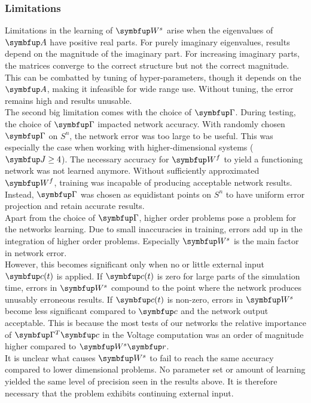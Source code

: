 \subsubsection{Limitations}
Limitations in the learning of $\bmu{W}^s$ arise when the eigenvalues of $\bmu{A}$ have positive real parts. For purely imaginary eigenvalues, results depend on the magnitude of the imaginary part. For increasing imaginary parts, the matrices converge to the correct structure but not the correct magnitude. This can be combatted by tuning of hyper-parameters, though it depends on the $\bmu{A}$, making it infeasible for wide range use. Without tuning, the error remains high and results unusable.\\
The second big limitation comes with the choice of $\bmu{\Gamma}$. During testing, the choice of $\bmu{\Gamma}$ impacted network accuracy. With randomly chosen $\bmu{\Gamma}$ on $\mathit{S}^n$, the network error was too large to be useful. This was especially the case when working with higher-dimensional systems ($\bmu{J}\geq4$). The necessary accuracy for $\bmu{W}^f$ to yield a functioning network was not learned anymore. Without sufficiently approximated $\bmu{W}^f$, training was incapable of producing acceptable network results.\\
Instead, $\bmu{\Gamma}$ was chosen as equidistant points on $\mathit{S}^n$ to have uniform error projection and retain accurate results.\\
Apart from the choice of $\bmu{\Gamma}$, higher order problems pose a problem for the networks learning. Due to small inaccuracies in training, errors add up in the integration of higher order problems. Especially $\bmu{W}^s$ is the main factor in network error.\\
However, this becomes significant only when no or little external input $\bmu{c}(t)$ is applied. If $\bmu{c}(t)$ is zero for large parts of the simulation time, errors in $\bmu{W}^s$ compound to the point where the network produces unusably erroneous results. If $\bmu{c}(t)$ is non-zero, errors in $\bmu{W}^s$ become less significant compared to $\bmu{c}$ and the network output acceptable. This is because the most tests of our networks the relative importance of $\bmu{\Gamma}^T\bmu{c}$ in the Voltage computation was an order of magnitude higher compared to $\bmu{W}^s\bmu{r}$.\\
It is unclear what causes $\bmu{W}^s$ to fail to reach the same accuracy compared to lower dimensional problems. No parameter set or amount of learning yielded the same level of precision seen in the results above. It is therefore necessary that the problem exhibits continuing external input.\\

